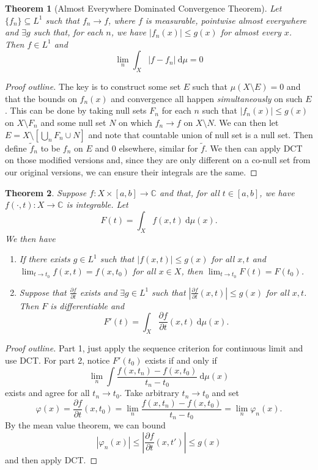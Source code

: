 \documentclass[letterpaper,12pt]{article}
\theoremstyle{definition}
\theoremstyle{plain}
\newtheorem{thm}{Theorem}[section]
\theoremstyle{remark}
\newcommand{\C}{\mathbb{C}}
\newcommand{\wt}{\widetilde}
\begin{document}
\begin{thm}[Almost Everywhere Dominated Convergence Theorem]
Let $\{f_n\}\subseteq L^1$ such that $f_n\to f$, where $f$ is measurable, pointwise almost everywhere and $\exists g$ such that, for each $n$, we have $|f_n(x)|\leq g(x)$ for almost every $x$. Then $f\in L^1$ and
\[\lim_n \int_X |f-f_n|\ \mathrm{d}\mu = 0\]
\end{thm}

\begin{proof}[Proof outline]
The key is to construct some set $E$ such that $\mu(X\setminus E) = 0$ and that the bounds on $f_n(x)$ and convergence all happen \emph{simultaneously} on such $E$. This can be done by taking null sets $F_n$ for each $n$ such that $|f_n(x)|\leq g(x)$ on $X\setminus F_n$ and some null set $N$ on which $f_n\to f$ on $X\setminus N$. We can then let $E = X\setminus [\bigcup_n F_n\cup N]$ and note that countable union of null set is a null set. Then define $\wt{f}_n$ to be $f_n$ on $E$ and $0$ elsewhere, similar for $\wt{f}$. We then can apply DCT on those modified versions and, since they are only different on a co-null set from our original versions, we can ensure their integrals are the same.
\end{proof}

\begin{thm}
Suppose $f:X\times[a,b]\to\C$ and that, for all $t\in[a,b]$, we have $f(\cdot,t):X\to\C$ is integrable. Let
\[F(t) = \int_X f(x,t)\ \mathrm{d}\mu(x).\]
We then have
\begin{enumerate}
  \item If there exists $g\in L^1$ such that $|f(x,t)|\leq g(x)$ for all $x,t$ and $\lim_{t\to t_0}f(x,t) = f(x,t_0)$ for all $x\in X$, then $\lim_{t\to t_0}F(t) = F(t_0)$.
  \item Suppose that $\frac{\partial f}{\partial t}$ exists and $\exists g\in L^1$ such that $\left|\frac{\partial f}{\partial t}(x,t)\right|\leq g(x)$ for all $x,t$. Then $F$ is differentiable and
  \[F'(t) = \int_X \frac{\partial f}{\partial t}(x,t)\ \mathrm{d}\mu(x).\]
\end{enumerate}
\end{thm}

\begin{proof}[Proof outline]
Part 1, just apply the sequence criterion for continuous limit and use DCT. For part 2, notice $F'(t_0)$ exists if and only if
\[\lim_n \int \frac{f(x,t_n)-f(x,t_0)}{t_n-t_0}\ \mathrm{d}\mu(x)\]
exists and agree for all $t_n\to t_0$. Take arbitrary $t_n\to t_0$ and set
\[\varphi(x) = \frac{\partial f}{\partial t}(x,t_0) = \lim_n \frac{f(x,t_n)-f(x,t_0)}{t_n-t_0} = \lim_n \varphi_n(x).\]
By the mean value theorem, we can bound
\[|\varphi_n(x)|\leq \left|\frac{\partial f}{\partial t}(x,t')\right|\leq g(x)\]
and then apply DCT.
\end{proof}
\end{document}
